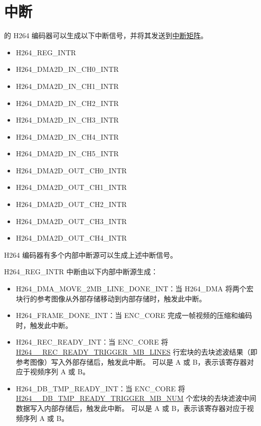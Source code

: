\documentclass[main\_\_CN.tex]{subfiles}
\begin{document}
\section{中断}
\label{sec:h264enc-interrupt}
\chipname{} 的 H264 编码器可以生成以下中断信号，并将其发送到\hyperref[mod:intmtrx]{中断矩阵}。
    \begin{itemize}
        \item H264\_REG\_INTR
        \item H264\_DMA2D\_IN\_CH0\_INTR
        \item H264\_DMA2D\_IN\_CH1\_INTR
        \item H264\_DMA2D\_IN\_CH2\_INTR
        \item H264\_DMA2D\_IN\_CH3\_INTR
        \item H264\_DMA2D\_IN\_CH4\_INTR
        \item H264\_DMA2D\_IN\_CH5\_INTR
        \item H264\_DMA2D\_OUT\_CH0\_INTR
        \item H264\_DMA2D\_OUT\_CH1\_INTR
        \item H264\_DMA2D\_OUT\_CH2\_INTR
        \item H264\_DMA2D\_OUT\_CH3\_INTR
        \item H264\_DMA2D\_OUT\_CH4\_INTR
    \end{itemize}

H264 编码器有多个内部中断源可以生成上述中断信号。

H264\_REG\_INTR 中断由以下内部中断源生成：
\begin{itemize}
\item H264\_DMA\_MOVE\_2MB\_LINE\_DONE\_INT：当 H264\_DMA 将两个宏块行的参考图像从外部存储移动到内部存储时，触发此中断。
\item H264\_FRAME\_DONE\_INT：当 ENC\_CORE 完成一帧视频的压缩和编码时，触发此中断。
\item H264\_REC\_READY\_INT：当 ENC\_CORE 将 \hyperref[fielddesc:H264ARECREADYTRIGGERMBLINES]{H264\_\_REC\_READY\_TRIGGER\_MB\_LINES} 行宏块的去块滤波结果（即参考图像）写入外部存储后，触发此中断。 可以是 A 或 B，表示该寄存器对应于视频序列 A 或 B。
\item H264\_DB\_TMP\_READY\_INT：当 ENC\_CORE 将 \hyperref[fielddesc:H264ADBTMPREADYTRIGGERMBNUM]{H264\_\_DB\_TMP\_READY\_TRIGGER\_MB\_NUM} 个宏块的去块滤波中间数据写入内部存储后，触发此中断。 可以是 A 或 B，表示该寄存器对应于视频序列 A 或 B。
\end{itemize}
\end{document}
